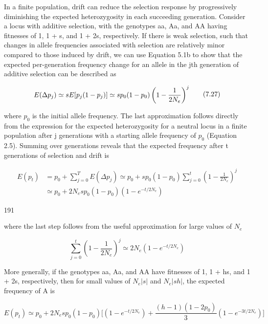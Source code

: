 \documentclass{article}
\begin{document}
In a finite population, drift can reduce the selection response by progressively diminishing the expected heterozygosity in each succeeding generation. Consider a locus with additive selection, with the genotypes aa, Aa, and AA having fitnesses of 1, 1 + s, and 1 + 2s, respectively. If there is weak selection, such that changes in allele frequencies associated with selection are relatively minor compared to those induced by drift, we can use Equation 5.1b to show that the expected per-generation frequency change for an allele in the jth generation of additive selection can be described as

\begin{equation}
\begin{align*}E(\Delta p_j)\simeq sE[p_j(1-p_j)]\simeq sp_0(1-p_0)\left(1-{1\over2N_e}\right)^j\end{align*}
\tag{7.27}
\label{eq:7_27}
\end{equation}

where  $ p_{0} $ is the initial allele frequency. The last approximation follows directly from the expression for the expected heterozygosity for a neutral locus in a finite population after j generations with a starting allele frequency of  $ p_{0} $ (Equation 2.5). Summing over generations reveals that the expected frequency after t generations of selection and drift is

\begin{equation}
\begin{align*}E(p_t)&=p_0+\sum_{j=0}^TE(\Delta p_j)\simeq p_0+sp_0(1-p_0)\sum_{j=0}^t\left(1-\frac{1}{2N_e}\right)^j\\&\simeq p_0+2N_e s p_0(1-p_0)\left(1-e^{-t/2N_e}\right)\end{align*}
\tag{7.28a}
\label{eq:7_28a}
\end{equation}

191

where the last step follows from the useful approximation for large values of  $ N_{e} $

\begin{equation}
\sum_{j=0}^{t}\left(1-\frac{1}{2N_{e}}\right)^{j}\simeq2N_{e}\left(1-e^{-t/2N_{e}}\right)
\tag{7.28b}
\label{eq:7_28b}
\end{equation}

More generally, if the genotypes aa, Aa, and AA have fitnesses of 1, 1 + hs, and 1 + 2s, respectively, then for small values of  $ N_e|s| $ and  $ N_e|sh| $, the expected frequency of A is

\begin{equation}
E(p_{t})\simeq p_{0}+2N_{e}sp_{0}(1-p_{0})\bigg[\left(1-e^{-t/2N_{e}}\right)+\frac{(h-1)(1-2p_{0})}{3}\left(1-e^{-3t/2N_{e}}\right)\bigg]
\tag{7.29}
\label{eq:7_29}
\end{equation}
\end{document}
